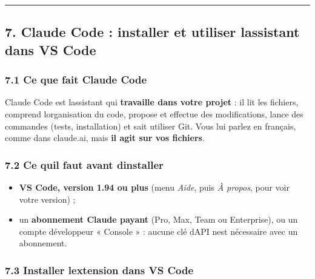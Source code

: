 \documentclass[
  french,
  11pt,
  a4paper,
]{article}
\providecommand{\tightlist}{%
  \setlength{\itemsep}{0pt}\setlength{\parskip}{0pt}}
\begin{document}
\begin{center}\rule{0.5\linewidth}{0.5pt}\end{center}

\subsection{7. Claude Code : installer et utiliser
l\textquotesingle assistant dans VS
Code}\label{7-claude-code--installer-et-utiliser-lassistant-dans-vs-code}

\subsubsection{7.1 Ce que fait Claude
Code}\label{71-ce-que-fait-claude-code}

Claude Code est l\textquotesingle assistant qui \textbf{travaille dans
votre projet} : il lit les fichiers, comprend
l\textquotesingle organisation du code, propose et effectue des
modifications, lance des commandes (tests, installation) et sait
utiliser Git. Vous lui parlez en français, comme dans claude.ai, mais
\textbf{il agit sur vos fichiers}.

\subsubsection{7.2 Ce qu\textquotesingle il faut avant
d\textquotesingle installer}\label{72-ce-quil-faut-avant-dinstaller}

\begin{itemize}
\tightlist
\item
  \textbf{VS Code, version 1.94 ou plus} (menu \emph{Aide}, puis \emph{À
  propos}, pour voir votre version) ;
\item
  un \textbf{abonnement Claude payant} (Pro, Max, Team ou Enterprise),
  ou un compte développeur « Console » : aucune clé
  d\textquotesingle API n\textquotesingle est nécessaire avec un
  abonnement.
\end{itemize}

\subsubsection{7.3 Installer l\textquotesingle extension dans VS
Code}\label{73-installer-lextension-dans-vs-code}
\end{document}
